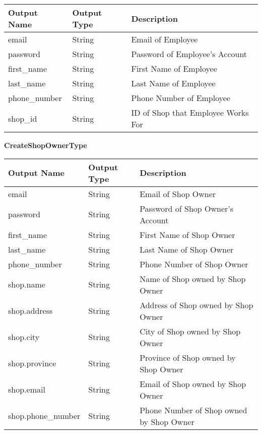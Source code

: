 \documentclass[12pt, titlepage]{article}
\begin{document}
\begin{table}[H]
	\begin{tabular}{|p{}|p{}|p{}|}
		\hline
		\textbf{Output Name} & \textbf{Output Type} & \textbf{Description}               \\
		\hline
		email                & String               & Email of Employee                  \\
		\hline
		password             & String               & Password of Employee's Account     \\
		\hline
		first\_name          & String               & First Name of Employee             \\
		\hline
		last\_name           & String               & Last Name of Employee              \\
		\hline
		phone\_number        & String               & Phone Number of Employee           \\
		\hline
		shop\_id             & String               & ID of Shop that Employee Works For \\
		\hline
	\end{tabular}
\end{table}

\textbf{CreateShopOwnerType}

\begin{table}[H]
	\begin{tabular}{|p{}|p{}|p{}|}
		\hline
		\textbf{Output Name} & \textbf{Output Type} & \textbf{Description}                     \\
		\hline
		email                & String               & Email of Shop Owner                      \\
		\hline
		password             & String               & Password of Shop Owner's Account         \\
		\hline
		first\_name          & String               & First Name of Shop Owner                 \\
		\hline
		last\_name           & String               & Last Name of Shop Owner                  \\
		\hline
		phone\_number        & String               & Phone Number of Shop Owner               \\
		\hline
		shop.name            & String               & Name of Shop owned by Shop Owner         \\
		\hline
		shop.address         & String               & Address of Shop owned by Shop Owner      \\
		\hline
		shop.city            & String               & City of Shop owned by Shop Owner         \\
		\hline
		shop.province        & String               & Province of Shop owned by Shop Owner     \\
		\hline
		shop.email           & String               & Email of Shop owned by Shop Owner        \\
		\hline
		shop.phone\_number   & String               & Phone Number of Shop owned by Shop Owner \\
		\hline
	\end{tabular}
\end{table}
\end{document}
